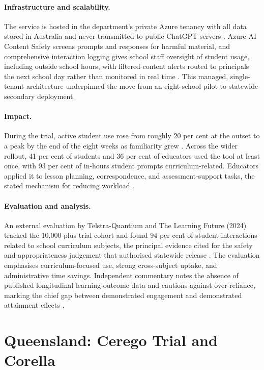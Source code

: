 \paragraph{Infrastructure and scalability.}
The service is hosted in the department's private Azure tenancy with all data stored
in Australia and never transmitted to public ChatGPT servers
\autocite{educationSAEdChat2025}. Azure AI Content Safety screens prompts and
responses for harmful material, and comprehensive interaction logging gives school
staff oversight of student usage, including outside school hours, with filtered-content
alerts routed to principals the next school day rather than monitored in real time
\autocite{microsoftEdChatContentSafety2024}. This managed, single-tenant architecture
underpinned the move from an eight-school pilot to statewide secondary deployment.

\paragraph{Impact.}
During the trial, active student use rose from roughly 20 per cent at the outset to a
peak by the end of the eight weeks as familiarity grew
\autocite{microsoftEdChatContentSafety2024}. Across the wider rollout, 41 per cent of
students and 36 per cent of educators used the tool at least once, with 93 per cent of
in-hours student prompts curriculum-related. Educators applied it to lesson planning,
correspondence, and assessment-support tasks, the stated mechanism for reducing
workload \autocite{microsoftLearningAIEra2024}.

\paragraph{Evaluation and analysis.}
An external evaluation by Telstra-Quantium and The Learning Future (2024) tracked the
10,000-plus trial cohort and found 94 per cent of student interactions related to
school curriculum subjects, the principal evidence cited for the safety and
appropriateness judgement that authorised statewide release
\autocite{educationSAEdChat2025}. The evaluation emphasises curriculum-focused use,
strong cross-subject uptake, and administrative time savings. Independent commentary
notes the absence of published longitudinal learning-outcome data and cautions against
over-reliance, marking the chief gap between demonstrated engagement and demonstrated
attainment effects \autocite{innovationausEdChatStatewide2025}.

\section{Queensland: Cerego Trial and Corella}
\label{sec:ai:queensland}

